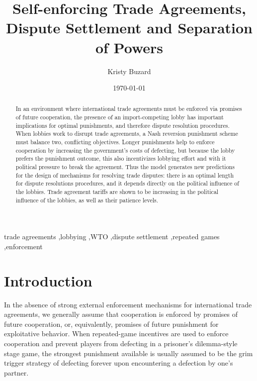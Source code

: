 \documentclass[authoryear, review]{elsarticle}
\begin{document}
\title{Self-enforcing Trade Agreements, Dispute Settlement and Separation of Powers}
\author{Kristy Buzard}
\address{110 Eggers Hall, Economics Department, Syracuse University, Syracuse, NY 13244. 315-443-4079.}
\date{\today}

\begin{abstract}
In an environment where international trade agreements must be enforced via promises of future cooperation, the presence of an import-competing lobby has important implications for optimal punishments, and therefore dispute resolution procedures. When lobbies work to disrupt trade agreements, a Nash reversion punishment scheme must balance two, conflicting objectives. Longer punishments help to enforce cooperation by increasing the government's costs of defecting, but because the lobby prefers the punishment outcome, this also incentivizes lobbying effort and with it political pressure to break the agreement. Thus the model generates new predictions for the design of mechanisms for resolving trade disputes: there is an optimal length for dispute resolutions procedures, and it depends directly on the political influence of the lobbies. Trade agreement tariffs are shown to be increasing in the political influence of the lobbies, as well as their patience levels.
\end{abstract}

\begin{keyword}

trade agreements \sep lobbying \sep WTO \sep dispute settlement \sep repeated games \sep enforcement

\end{keyword}

\maketitle

\section{Introduction}
\label{sec:intro}
In the absence of strong external enforcement mechanisms for international trade agreements, we generally assume that cooperation is enforced by promises of future cooperation, or, equivalently, promises of future punishment for exploitative behavior. When repeated-game incentives are used to enforce cooperation and prevent players from defecting in a prisoner's dilemma-style stage game, the strongest punishment available is usually assumed to be the grim trigger strategy of defecting forever upon encountering a defection by one's partner.
\end{document}
